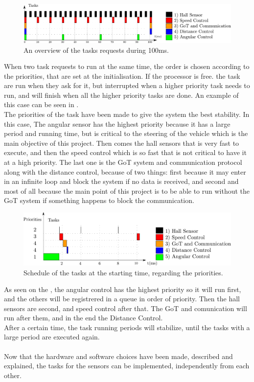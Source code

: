  \begin{figure}[H]
	\centering
	\includegraphics[scale=0.6]{figures/scheduleRequest.pdf}
	\caption{An overview of the tasks requests during 100ms.}
	\label{scheduleRequestd}
\end{figure}


When two task requests to run at the same time, the order is chosen according to the priorities, that are set at the initialisation. If the processor is free. the task are run when they ask for it, but interrupted when a higher priority task needs to run, and will finish when all the higher priority tasks are done. An example of this case can be seen in .\\
The priorities of the task have been made to give the system the best stability. In this case, The angular sensor has the highest priority because it has a large period and running time, but is critical to the steering of the vehicle which is the main objective of this project. Then comes the hall sensors that is very fast to execute, and then the speed control which is so fast that is not critical to have it at a high priority. The last one is the GoT system and communication protocol along with the distance control, because of two things: first because it may enter in an infinite loop and block the system if no data is received, and second and most of all because the main point of this project is to be able to run without the GoT system if something happens to block the communication.

 \begin{figure}[H]
	\centering
	\includegraphics[scale=0.5]{figures/schedulePriorities.pdf}
	\caption{Schedule of the tasks at the starting time, regarding the priorities.}
	\label{schedulePriorities}
\end{figure}

As seen on the  , the angular control has the highest priority so it will run first, and the others will be registrered in a queue in order of priority. Then the hall sensors are second, and speed control after that. The GoT and comunication will run after them, and in the end the Distance Control.\\
After a certain time, the task running periods will stabilize, until the tasks with a large period are executed again.\\\\

Now that the hardware and software choices have been made, described and explained, the tasks for the sensors can be implemented, independently from each other.